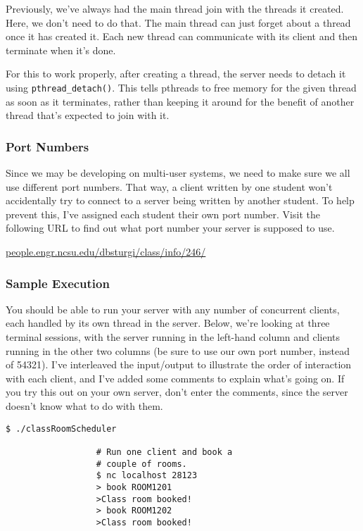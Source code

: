 \documentclass{article}
\begin{document}
\begin{enumerate}
  Previously, we've always had the main thread join with the threads
  it created.  Here, we don't need to do that.  The main thread can
  just forget about a thread once it has created it.  Each new thread can
  communicate with its client and then terminate when it's done.

  For this to work properly, after creating a thread, the server needs
  to detach it using \texttt{pthread\_detach()}.  This tells pthreads
  to free memory for the given thread as soon as it terminates, rather
  than keeping it around for the benefit of another thread that's
  expected to join with it.

\subsubsection*{Port Numbers}

  Since we may be developing on multi-user systems, we need to make
  sure we all use different port numbers.  That way, a client written
  by one student won't accidentally try to connect to a server being
  written by another student.  To help prevent this, I've assigned
  each student their own port number.  Visit the following URL to find
  out what port number your server is supposed to use.

\url{people.engr.ncsu.edu/dbsturgi/class/info/246/}
 
 \subsubsection*{Sample Execution}

  You should be able to run your server with any number of concurrent
  clients, each handled by its own thread in the server.  Below, we're
  looking at three terminal sessions, with the server running in the
  left-hand column and clients running in the other two columns (be
  sure to use our own port number, instead of 54321).  I've
  interleaved the input/output to illustrate the order of interaction
  with each client, and I've added some comments to explain what's
  going on.  If you try this out on your own server, don't enter the
  comments, since the server doesn't know what to do with them.

\begin{verbatim}
$ ./classRoomScheduler

                  # Run one client and book a
                  # couple of rooms.
                  $ nc localhost 28123
                  > book ROOM1201
                  >Class room booked!
                  > book ROOM1202
                  >Class room booked!


\end{verbatim}
\end{enumerate}
\end{document}
